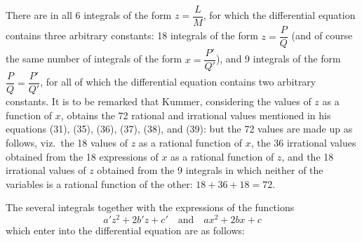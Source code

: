\documentclass[12pt,a4paper,oneside]{book}
\theoremstyle{plain}
\theoremstyle{definition}
\theoremstyle{remark}
\begin{document}
There are in all 6 integrals of the form $z=\dfrac{L}{M}$, for which the differential equation contains three arbitrary constants: 18 integrals of the form $z=\dfrac{P}{Q}$ (and of course the same number of integrals of the form $x=\dfrac{P'}{Q'}$), and 9 integrals of the form $\dfrac{P}{Q}=\dfrac{P'}{Q'}$, for all of which the differential equation contains two arbitrary constants. It is to be remarked that Kummer, considering the values of $z$ as a function of $x$, obtains the 72 rational and irrational values mentioned in his equations (31), (35), (36), (37), (38), and (39): but the 72 values are made up as follows, viz.\ the 18 values of $z$ as a rational function of $x$, the 36 irrational values obtained from the 18 expressions of $x$ as a rational function of $z$, and the 18 irrational values of $z$ obtained from the 9 integrals in which neither of the variables is a rational function of the other: $18+36+18=72$.

\smallskip

The several integrals together with the expressions of the functions
\[
a'z^2+2b'z+c'\quad \text{and}\quad ax^2+2bx+c
\]
which enter into the differential equation are as follows:
\end{document}
